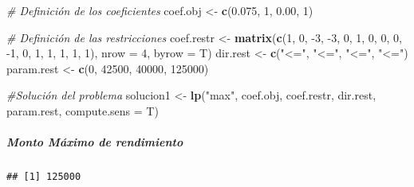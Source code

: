 \documentclass[
]{article}
\newenvironment{Shaded}{\begin{snugshade}}{\end{snugshade}}
\newcommand{\CommentTok}[1]{\textcolor[rgb]{0.56,0.35,0.01}{\textit{#1}}}
\newcommand{\DataTypeTok}[1]{\textcolor[rgb]{0.13,0.29,0.53}{#1}}
\newcommand{\DecValTok}[1]{\textcolor[rgb]{0.00,0.00,0.81}{#1}}
\newcommand{\FloatTok}[1]{\textcolor[rgb]{0.00,0.00,0.81}{#1}}
\newcommand{\KeywordTok}[1]{\textcolor[rgb]{0.13,0.29,0.53}{\textbf{#1}}}
\newcommand{\NormalTok}[1]{#1}
\newcommand{\OperatorTok}[1]{\textcolor[rgb]{0.81,0.36,0.00}{\textbf{#1}}}
\newcommand{\StringTok}[1]{\textcolor[rgb]{0.31,0.60,0.02}{#1}}
\begin{document}
\begin{Shaded}
\begin{Highlighting}[]
\CommentTok{# Definición de los coeficientes}
\NormalTok{coef.obj <-}\StringTok{ }\KeywordTok{c}\NormalTok{(}\FloatTok{0.075}\NormalTok{, }\DecValTok{1}\NormalTok{, }\FloatTok{0.00}\NormalTok{, }\DecValTok{1}\NormalTok{)}

\CommentTok{# Definición de las restricciones}
\NormalTok{coef.restr <-}\StringTok{ }\KeywordTok{matrix}\NormalTok{(}\KeywordTok{c}\NormalTok{(}\DecValTok{1}\NormalTok{, }\DecValTok{0}\NormalTok{, }\DecValTok{-3}\NormalTok{, }\DecValTok{-3}\NormalTok{, }\DecValTok{0}\NormalTok{, }\DecValTok{1}\NormalTok{, }\DecValTok{0}\NormalTok{, }\DecValTok{0}\NormalTok{, }\DecValTok{0}\NormalTok{, }\DecValTok{-1}\NormalTok{, }\DecValTok{0}\NormalTok{, }\DecValTok{1}\NormalTok{, }\DecValTok{1}\NormalTok{, }\DecValTok{1}\NormalTok{, }\DecValTok{1}\NormalTok{, }\DecValTok{1}\NormalTok{), }\DataTypeTok{nrow =} \DecValTok{4}\NormalTok{, }\DataTypeTok{byrow =}\NormalTok{ T)}
\NormalTok{dir.rest <-}\StringTok{ }\KeywordTok{c}\NormalTok{(}\StringTok{"<="}\NormalTok{, }\StringTok{"<="}\NormalTok{, }\StringTok{"<="}\NormalTok{, }\StringTok{"<="}\NormalTok{)}
\NormalTok{param.rest <-}\StringTok{ }\KeywordTok{c}\NormalTok{(}\DecValTok{0}\NormalTok{, }\DecValTok{42500}\NormalTok{, }\DecValTok{40000}\NormalTok{, }\DecValTok{125000}\NormalTok{)}

\CommentTok{#Solución del problema}
\NormalTok{solucion1 <-}\StringTok{ }\KeywordTok{lp}\NormalTok{(}\StringTok{"max"}\NormalTok{, coef.obj, coef.restr, dir.rest, param.rest, }\DataTypeTok{compute.sens =}\NormalTok{ T)}
\end{Highlighting}
\end{Shaded}

\hypertarget{monto-muxe1ximo-de-rendimiento-1}{%
\subparagraph{Monto Máximo de
rendimiento}\label{monto-muxe1ximo-de-rendimiento-1}}

\begin{Shaded}
\end{Shaded}

\begin{verbatim}
## [1] 125000
\end{verbatim}

\begin{Shaded}
\end{Shaded}
\end{document}
